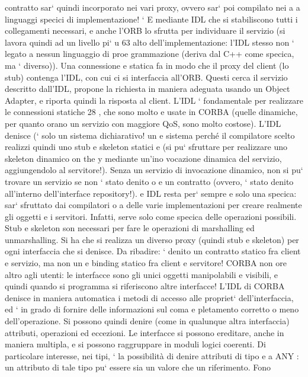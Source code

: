 \documentclass[a4paper,12pt]{article}
\begin{document}
contratto sar` quindi incorporato nei vari proxy, ovvero sar` poi compilato nei
a
a
linguaggi specici di implementazione!
`
E mediante IDL che si stabiliscono tutti i collegamenti necessari, e anche
l'ORB lo sfrutta per individuare il servizio (si lavora quindi ad un livello pi`
u
63
\newpage
alto dell'implementazione: l'IDL stesso non ` legato a nessun linguaggio di proe
grammazione (deriva dal C++ come specica, ma ` diverso)). Una connessione
e
statica fa in modo che il proxy del client (lo stub) contenga l'IDL, con cui ci
si interfaccia all'ORB. Questi cerca il servizio descritto dall'IDL, propone la
richiesta in maniera adeguata usando un Object Adapter, e riporta quindi la
risposta al client.
L'IDL ` fondamentale per realizzare le connessioni statiche 28 , che sono molto
e
usate in CORBA (quelle dinamiche, per quanto orano un servizio con maggiore
QoS, sono molto costose). L'IDL denisce (` solo un sistema dichiarativo! un
e
sistema perché il compilatore scelto realizzi quindi uno stub e skeleton statici
e
(si pu` sfruttare per realizzare uno skeleton dinamico on the y mediante un'ino
vocazione dinamica del servizio, aggiungendolo al servitore!). Senza un servizio
di invocazione dinamico, non si pu` trovare un servizio se non ` stato denito
o
e
un contratto (ovvero, ` stato denito all'interno dell'interface repository!).
e
IDL resta per` sempre e solo una specica: sar` sfruttato dai compilatori
o
a
delle varie implementazioni per creare realmente gli oggetti e i servitori. Infatti,
serve solo come specica delle operazioni possibili.
Stub e skeleton son necessari per fare le operazioni di marshalling ed unmarshalling. Si ha che si realizza un diverso
proxy (quindi stub e skeleton) per ogni
interfaccia che si denisce.
Da ribadire: ` denito un contratto statico fra client e servizio, ma non un
e
binding statico fra client e servitore!
CORBA non ore altro agli utenti: le interfacce sono gli unici oggetti manipolabili e visibili, e quindi quando si
programma si riferiscono altre interfacce!
L'IDL di CORBA denisce in maniera automatica i metodi di accesso alle
propriet` dell'interfaccia, ed ` in grado di fornire delle informazioni sul coma
e
pletamento corretto o meno dell'operazione. Si possono quindi denire (come
in qualunque altra interfaccia) attributi, operazioni ed eccezioni. Le interfacce
si possono ereditare, anche in maniera multipla, e si possono raggruppare in
moduli logici coerenti.
Di particolare interesse, nei tipi, ` la possibilità di denire attributi di tipo
e
a
ANY : un attributo di tale tipo pu` essere sia un valore che un riferimento. Fono
\end{document}
